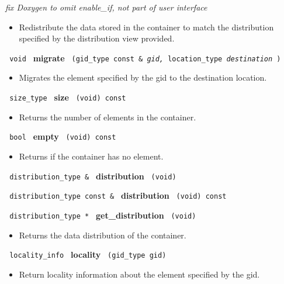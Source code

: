\vspace{0.4cm} \emph{fix Doxygen to omit enable\_if, not part of user interface}

\begin{itemize}
\item
Redistribute the data stored in the container to match the distribution specified by the distribution view provided. 
\end{itemize}
 
\noindent
\texttt{%
void
}
\textbf{migrate}%
\texttt{%
(gid\_type const \&
\textit{gid,}
location\_type 
\textit{destination}
)
}

\begin{itemize}
\item
Migrates the element specified by the gid to the destination location. 
\end{itemize}
 
\noindent
\texttt{%
size\_type
}
\textbf{size}%
\texttt{%
(void) const
}

\begin{itemize}
\item
Returns the number of elements in the container. 
\end{itemize}
 
\noindent
\texttt{%
bool
}
\textbf{empty}%
\texttt{%
(void) const
}

\begin{itemize}
\item
Returns if the container has no element.
\end{itemize}
 
\noindent
\texttt{%
distribution\_type \& 
}
\textbf{distribution}%
\texttt{%
 (void)
}
 
\noindent
\texttt{%
distribution\_type const \& 
}
\textbf{distribution}%
\texttt{%
 (void) const
}
 
\noindent
\texttt{%
distribution\_type *
}
\textbf{get\_distribution}%
\texttt{%
(void)
}
 
\begin{itemize}
\item
Returns the data distribution of the container.
\end{itemize}

\noindent
\texttt{%
locality\_info 
}
\textbf{locality}%
\texttt{%
 (gid\_type gid)
}

\begin{itemize}
\item
Return locality information about the element specified by the gid. 
\end{itemize}
 
